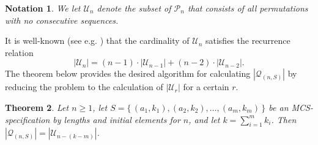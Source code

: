 \documentclass{article}
\newtheorem{theorem}{Theorem}[section]
\newtheorem{notation}[theorem]{Notation}
\begin{document}
\begin{notation}
  We let ${\mathcal U}_n$ denote the subset of ${\mathcal P}_n$ that consists of all permutations with no consecutive
  sequences.
\end{notation}

It is well-known (see e.g. \cite{JedYang}) that the cardinality of ${\mathcal U}_n$ satisfies the recurrence relation
$$
|{\mathcal U}_n| = (n-1) \cdot |{\mathcal U}_{n-1}| + (n-2) \cdot |{\mathcal U}_{n-2}|.
$$
The theorem below provides the desired algorithm for calculating $|{\mathcal Q}_{(n,S)}|$ by reducing the
problem to the calculation of $|{\mathcal U}_r|$ for a certain $r$.
 
\begin{theorem}\label{theorem_count_by_length_and_initial_element}
  Let $n \geq 1$, let $S = \{\,(a_1, k_1), (a_2, k_2), \ldots,(a_m, k_m)\,\}$ be an
  MCS-specification by lengths and initial elements for $n$, and let $k = \sum_{i=1}^m k_i$.
  Then $|{\mathcal Q}_{(n,S)}| = |{\mathcal U}_{n - (k - m)}|$.
\end{theorem}
\end{document}
